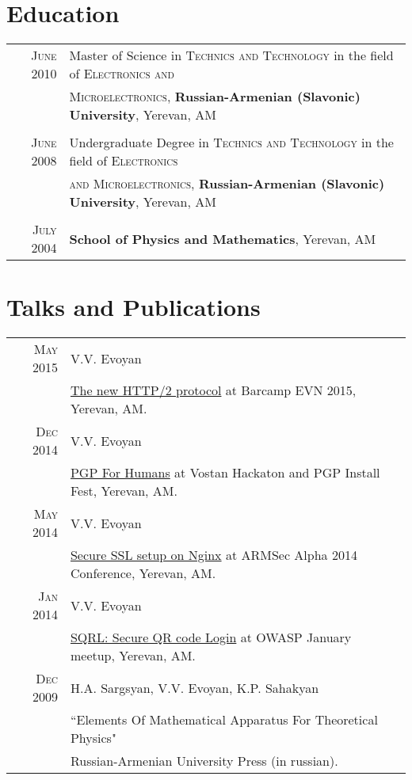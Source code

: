 \documentclass[a4paper,10pt]{article}
\begin{document}
\section{Education}
\begin{tabular}{rl}
  \textsc{June} 2010
    & Master of Science in \textsc{Technics and Technology}
      in the field of \textsc{Electronics and} \\ & \textsc{Microelectronics},
    \textbf{Russian-Armenian (Slavonic) University}, Yerevan, AM \\
  & \\
  \textsc{June} 2008
    & Undergraduate Degree in \textsc{Technics and Technology}
      in the field of \textsc{Electronics} \\ & \textsc{and Microelectronics},
    \textbf{Russian-Armenian (Slavonic) University}, Yerevan, AM \\
  & \\
  \textsc{July} 2004
  & \textbf{School of Physics and Mathematics}, Yerevan, AM
\end{tabular}


\section{Talks and Publications}
\begin{tabular}{rl}
  \textsc{May} 2015
    & V.V. Evoyan \\
    & \href{https://evoyan.org/http2-barcamp/}{The new HTTP/2 protocol}
      at Barcamp EVN 2015, Yerevan, AM. \\
  \textsc{Dec} 2014
    & V.V. Evoyan \\
    & \href{https://evoyan.org/pgp-for-humans/}{PGP For Humans}
      at Vostan Hackaton and PGP Install Fest, Yerevan, AM. \\
  \textsc{May} 2014
    & V.V. Evoyan \\ &
    \href{http://vahe-evoyan.github.io/nginxssl-presentation/}
         {Secure SSL setup on Nginx} at ARMSec Alpha 2014 Conference,
         Yerevan, AM. \\
  \textsc{Jan} 2014
    & V.V. Evoyan \\
    & \href{https://prezi.com/qpgpm6zuxirv/sqrl}{SQRL: Secure QR code Login}
      at OWASP January meetup, Yerevan, AM. \\
  \textsc{Dec} 2009
    & H.A. Sargsyan, V.V. Evoyan, K.P. Sahakyan \\
    & ``Elements Of Mathematical Apparatus For Theoretical Physics" \\
    & Russian-Armenian University Press (in russian).
\end{tabular}
\end{document}
